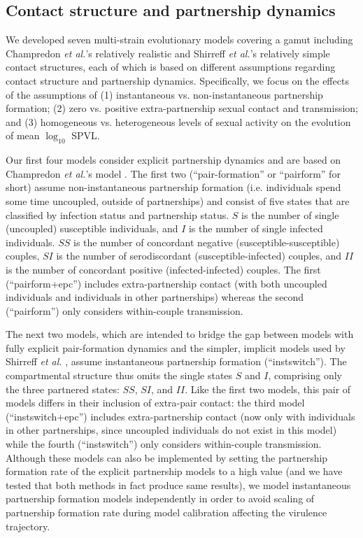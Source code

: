 \documentclass[10pt,letterpaper]{article}
\newcommand{\Lspvl}{$\log_{10}$ SPVL}
\newcommand{\etal}{\textit{et al.}}
\begin{document}
\subsection*{Contact structure and partnership dynamics}

We developed seven multi-strain evolutionary models covering a gamut including Champredon \etal's relatively realistic \cite{champredon_hiv_2013} and Shirreff \etal's relatively simple \cite{shirreff_transmission_2011} contact structures, each of which is based on different assumptions regarding contact structure and partnership dynamics. Specifically, we focus on the effects of the assumptions of (1) instantaneous vs. non-instantaneous partnership formation; (2) zero vs. positive extra-partnership sexual contact and transmission; and (3) homogeneous vs. heterogeneous levels of sexual activity on the evolution of mean \Lspvl.

Our first four models consider explicit partnership dynamics and are based on Champredon \etal's model \cite{champredon_hiv_2013}. The first two (``pair-formation'' or ``pairform'' for short) assume non-instantaneous partnership formation (i.e. individuals spend some time uncoupled, outside of partnerships) and consist of five states that are classified by infection status and partnership status. $S$ is the number of single (uncoupled) susceptible individuals, and $I$ is the number of single infected individuals. $SS$ is the number of concordant negative (susceptible-susceptible) couples, $SI$ is the number of serodiscordant (susceptible-infected) couples, and $II$ is the number of concordant positive (infected-infected) couples. The first (``pairform+epc'') includes extra-partnership contact (with both uncoupled individuals and individuals in other partnerships) whereas the second (``pairform'') only considers within-couple transmission. 

The next two models, which are intended to bridge the gap between models with fully explicit pair-formation dynamics and the simpler, implicit models used by Shirreff \emph{et al.} \cite{shirreff_transmission_2011}, assume instantaneous partnership formation (``instswitch''). The compartmental structure thus omits the single states $S$ and $I$, comprising only the three partnered states: $SS$, $SI$, and $II$. Like the first two models, this pair of models differs in their inclusion of extra-pair contact: the third model (``instswitch+epc'') includes extra-partnership contact (now only with individuals in other partnerships, since uncoupled individuals do not exist in this model) while the fourth (``instswitch'') only considers within-couple transmission. Although these models can also be implemented
by setting the partnership formation rate of the explicit partnership models to a high value (and we have tested that both methods in fact produce same results), we model instantaneous partnership formation models independently in order to avoid scaling of partnership formation rate during model calibration affecting the virulence trajectory.
\end{document}
